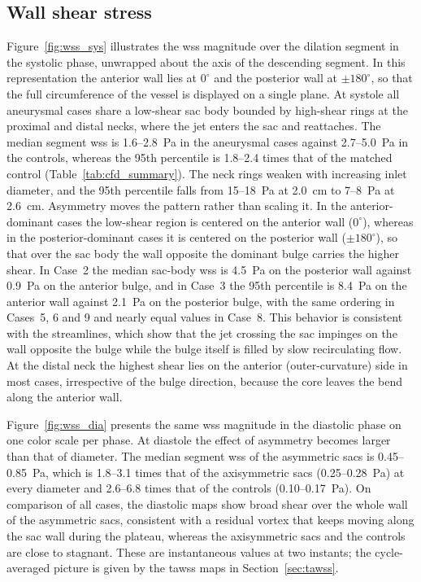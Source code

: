 \documentclass[12pt,a4paper]{article}
\newcommand{\WSS}{\ac{wss}\xspace}
\newcommand{\TAWSS}{\ac{tawss}\xspace}
\theoremstyle{definition}
\numberwithin{equation}{section}
\begin{document}


\subsection{Wall shear stress}
Figure~\ref{fig:wss_sys} illustrates the \WSS magnitude over the dilation segment in the systolic phase, unwrapped about the axis of the descending segment. In this representation the anterior wall lies at \(0^\circ\) and the posterior wall at \(\pm180^\circ\), so that the full circumference of the vessel is displayed on a single plane. At systole all aneurysmal cases share a low-shear sac body bounded by high-shear rings at the proximal and distal necks, where the jet enters the sac and reattaches. The median segment \WSS is 1.6--2.8~Pa in the aneurysmal cases against 2.7--5.0~Pa in the controls, whereas the 95th percentile is 1.8--2.4 times that of the matched control (Table~\ref{tab:cfd_summary}). The neck rings weaken with increasing inlet diameter, and the 95th percentile falls from 15--18~Pa at 2.0~cm to 7--8~Pa at 2.6~cm. Asymmetry moves the pattern rather than scaling it. In the anterior-dominant cases the low-shear region is centered on the anterior wall (\(0^\circ\)), whereas in the posterior-dominant cases it is centered on the posterior wall (\(\pm180^\circ\)), so that over the sac body the wall opposite the dominant bulge carries the higher shear. In Case~2 the median sac-body \WSS is 4.5~Pa on the posterior wall against 0.9~Pa on the anterior bulge, and in Case~3 the 95th percentile is 8.4~Pa on the anterior wall against 2.1~Pa on the posterior bulge, with the same ordering in Cases~5, 6 and 9 and nearly equal values in Case~8. This behavior is consistent with the streamlines, which show that the jet crossing the sac impinges on the wall opposite the bulge while the bulge itself is filled by slow recirculating flow. At the distal neck the highest shear lies on the anterior (outer-curvature) side in most cases, irrespective of the bulge direction, because the core leaves the bend along the anterior wall.

Figure~\ref{fig:wss_dia} presents the same \WSS magnitude in the diastolic phase on one color scale per phase. At diastole the effect of asymmetry becomes larger than that of diameter. The median segment \WSS of the asymmetric sacs is 0.45--0.85~Pa, which is 1.8--3.1 times that of the axisymmetric sacs (0.25--0.28~Pa) at every diameter and 2.6--6.8 times that of the controls (0.10--0.17~Pa). On comparison of all cases, the diastolic maps show broad shear over the whole wall of the asymmetric sacs, consistent with a residual vortex that keeps moving along the sac wall during the plateau, whereas the axisymmetric sacs and the controls are close to stagnant. These are instantaneous values at two instants; the cycle-averaged picture is given by the \TAWSS maps in Section~\ref{sec:tawss}.
\end{document}
